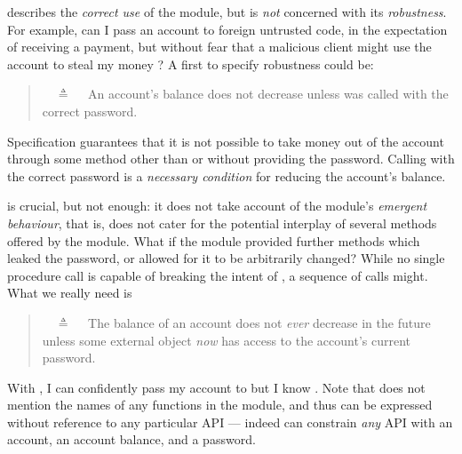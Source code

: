     \vspace{.05in}
 
\Scorrect  describes  {the \emph{correct use} of the module, but is \emph{not} concerned with its \emph{robustness}.}
{For example, can I pass an account to foreign untrusted code, in the expectation of receiving a payment,
but without fear that a malicious client might use the account to steal my money \cite{ELang}?}
 A first  to specify robustness could be:
 

\begin{quote}
\SrobustA\ \ $\triangleq$ \ \ An account's balance does not decrease unless  was called 
with the correct password.
\end{quote}

Specification \SrobustA %
{guarantees} that it is not possible to  take money out of the account through some method other than 
{or without providing the password}.
  Calling    with the  correct password is 
a \emph{necessary condition} for reducing the account's  balance.

\SrobustA is  crucial, but  not   enough:
it does not take  account of the module's \emph{emergent behaviour},
{that is, does not cater for the potential interplay of several methods offered by the module.}
 What if the module provided further methods which leaked the password,  
 {or allowed for it to be arbitrarily changed}?
{ While no single procedure call is capable of breaking the intent of \SrobustA, a sequence of calls might.}
{What} we really need is
 \begin{quote}
\SrobustB\ \ $\triangleq$ \ \ The balance of an account does not {\emph{ever}} decrease in the future unless some external 
object  {\emph{now}} has access to the account's current password.
\end{quote}
With \SrobustB, I can confidently pass my account to  
but I know 
 \cite{ooToSecurity,miller-esop2013}. 
 Note that \SrobustB  does not mention
 the names of any functions in the module, and 
 thus can be expressed without reference to any particular API ---
 indeed \SrobustB can constrain \emph{any} API with an account, an account
 balance, and a password.

